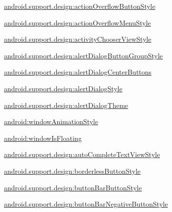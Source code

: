 {\ttfamily \hyperlink{classandroid_1_1support_1_1design_1_1R_1_1styleable_a1a82f2c29c2dd5fb202086c562a387a4}{android.\+support.\+design\+:action\+Overflow\+Button\+Style}}

{\ttfamily \hyperlink{classandroid_1_1support_1_1design_1_1R_1_1styleable_a9665b225f5841e21d3041cc0b4bc2c20}{android.\+support.\+design\+:action\+Overflow\+Menu\+Style}}

{\ttfamily \hyperlink{classandroid_1_1support_1_1design_1_1R_1_1styleable_acf223883bba2bd20dfcd85b3817e5c51}{android.\+support.\+design\+:activity\+Chooser\+View\+Style}}

{\ttfamily \hyperlink{classandroid_1_1support_1_1design_1_1R_1_1styleable_a677c1a9a3b75fec8ef5728a4e4d62af1}{android.\+support.\+design\+:alert\+Dialog\+Button\+Group\+Style}}

{\ttfamily \hyperlink{classandroid_1_1support_1_1design_1_1R_1_1styleable_a80b2dc95b64789c884807b4dcd06b6d0}{android.\+support.\+design\+:alert\+Dialog\+Center\+Buttons}}

{\ttfamily \hyperlink{classandroid_1_1support_1_1design_1_1R_1_1styleable_ac70cd07091cc32fa36cbc2c66306ee94}{android.\+support.\+design\+:alert\+Dialog\+Style}}

{\ttfamily \hyperlink{classandroid_1_1support_1_1design_1_1R_1_1styleable_ab193347a11cc3f92c5815a51c851a4a6}{android.\+support.\+design\+:alert\+Dialog\+Theme}}

{\ttfamily \hyperlink{classandroid_1_1support_1_1design_1_1R_1_1styleable_a6b9a59df5797c2d5c2db14b13076bccd}{android\+:window\+Animation\+Style}}

{\ttfamily \hyperlink{classandroid_1_1support_1_1design_1_1R_1_1styleable_addf459f4095c33a1a44b0cdeea8a72d9}{android\+:window\+Is\+Floating}}

{\ttfamily \hyperlink{classandroid_1_1support_1_1design_1_1R_1_1styleable_ac4ebe90582d8572ba360303f2afe7100}{android.\+support.\+design\+:auto\+Complete\+Text\+View\+Style}}

{\ttfamily \hyperlink{classandroid_1_1support_1_1design_1_1R_1_1styleable_a51f25c97407bb9f72b8b17f1681d354c}{android.\+support.\+design\+:borderless\+Button\+Style}}

{\ttfamily \hyperlink{classandroid_1_1support_1_1design_1_1R_1_1styleable_af8735dbd6db5ad3231c6574488067693}{android.\+support.\+design\+:button\+Bar\+Button\+Style}}

{\ttfamily \hyperlink{classandroid_1_1support_1_1design_1_1R_1_1styleable_aeede02e7ba2a6ab7672998a15ad32367}{android.\+support.\+design\+:button\+Bar\+Negative\+Button\+Style}}


